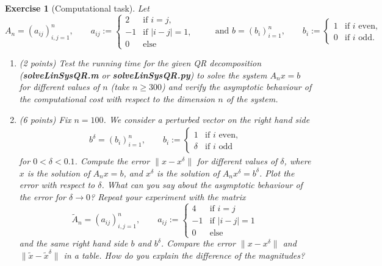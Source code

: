 \documentclass[11pt,a4paper,english,hyperref]{article}
\newcounter{aufgabeNummer}
\theoremstyle{break}   %
\newtheorem{Aufgabe}[aufgabeNummer]{Exercise}
\begin{document}
\begin{Aufgabe}[Computational task]
Let $$
A_n=(a_{ij})_{i,j=1}^n,\qquad a_{ij}:=\begin{cases} 2 & \text{if }i=j,\\ -1 &\text{if }|i-j|=1, \\ 0 & \text{else}
\end{cases} \qquad \text{ and }b=(b_i)_{i=1}^n, \qquad b_{i}:=\begin{cases} 1 & \text{if }i \text{ even},\\ 0 & \text{if }i\text{ odd.}
\end{cases}
$$
\begin{enumerate}
\item (2 points) Test the running time for the given QR decomposition (\textbf{solveLinSysQR.m} or \textbf{solveLinSysQR.py}) to solve the system \(A_n x = b\) for different values of \(n\) (take \(n \geq 300\)) and verify the asymptotic behaviour of the computational cost with respect to the dimension \(n\) of the system.
\item[(b$^*$)] (6 points) Fix \(n=100\). We consider a perturbed vector on the right hand side
\begin{align*}
b^{\delta}=(b_i)_{i=1}^n, \qquad b_{i}:=\begin{cases} 1 & \text{if }i \text{ even},\\ \delta & \text{if }i\text{ odd}
\end{cases}
\end{align*}
for \(0<\delta< 0.1\). Compute the error \(\|x-x^{\delta}\|\) for different values of \(\delta\), where \(x\) is the solution of \(A_n x= b\), and \(x^{\delta}\) is the solution of \(A_n x^{\delta} = b^{\delta}\). Plot the error with respect to \(\delta\). What can you say about the asymptotic behaviour of the error for \(\delta \rightarrow 0\)? Repeat your experiment with the matrix
$$
\tilde{A}_n=(a_{ij})_{i,j=1}^n,\qquad a_{ij}:=\begin{cases} 4 & \text{if }i=j\\ -1 &\text{if }|i-j|=1 \\ 0 & \text{else}
\end{cases}\
$$
and the same right hand side \(b\) and \(b^{\delta}\). Compare the error \(\|x-x^{\delta}\|\)  and \(\|\tilde{x}-\tilde{x}^{\delta}\|\) in a table. How do you explain the difference of the magnitudes?
\end{enumerate}
\end{Aufgabe}
\newpage 
\end{document}
